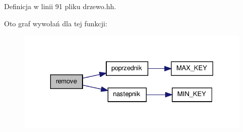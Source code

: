 Definicja w linii 91 pliku drzewo.\-hh.



Oto graf wywołań dla tej funkcji\-:
\nopagebreak
\begin{figure}[H]
\begin{center}
\leavevmode
\includegraphics[width=330pt]{drzewo_8hh_a5e0e50babdc5ca3c25d19183603ed0c6_cgraph}
\end{center}
\end{figure}


